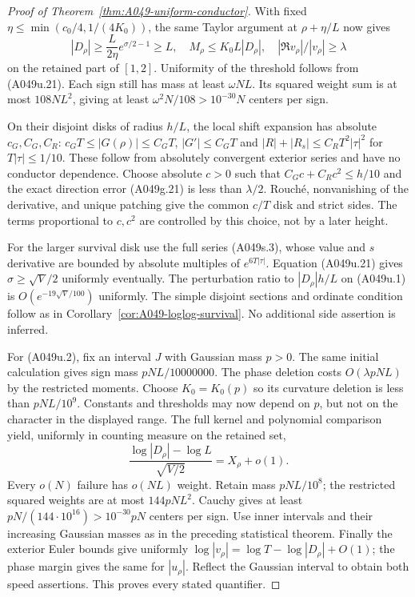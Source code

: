 \begin{proof}[Proof of Theorem~\ref{thm:A049-uniform-conductor}]
With fixed $\eta\le\min(c_0/4,1/(4K_0))$, the same
Taylor argument at $\rho+\eta/L$ now gives
\[
 |D_\rho|\ge\frac{L}{2\eta}e^{\sigma/2-1}\ge L,\quad
 M_\rho\le K_0L|D_\rho|,\quad
 |\Re v_\rho|/|v_\rho|\ge\lambda
\tag{A049u.25}
\]
on the retained part of $[1,2]$. Uniformity of the
threshold follows from (A049u.21).
Each sign still has mass at least $\omega NL$.
Its squared weight sum is at most $108NL^2$, giving
at least $\omega^2N/108>10^{-30}N$ centers per sign.

On their disjoint disks of radius $h/L$, the local
shift expansion has absolute $c_G,C_G,C_R$:
$c_GT\le|G(\rho)|\le C_GT$, $|G'|\le C_GT$ and
$|R|+|R_s|\le C_RT^2|\tau|^2$ for $T|\tau|\le1/10$.
These follow from absolutely convergent exterior
series and have no conductor dependence.
Choose absolute $c>0$ such that
$C_Gc+C_Rc^2\le h/10$ and the exact direction error
(A049g.21) is less than $\lambda/2$.
Rouch\'e, nonvanishing of the derivative, and unique
patching give the common $c/T$ disk and strict sides.
The terms proportional to $c,c^2$ are controlled by
this choice, not by a later height.

For the larger survival disk use the full series
(A049s.3), whose value and $s$ derivative are bounded
by absolute multiples of $e^{6T|\tau|}$.
Equation (A049u.21) gives $\sigma\ge\sqrt V/2$
uniformly eventually. The perturbation ratio to
$|D_\rho|h/L$ on (A049u.1) is
$O(e^{-19\sqrt V/100})$ uniformly.
The simple disjoint sections and ordinate condition
follow as in Corollary~\ref{cor:A049-loglog-survival}.
No additional side assertion is inferred.

For (A049u.2), fix an interval $J$ with Gaussian
mass $p>0$. The same initial calculation gives
sign mass $pNL/10000000$.
The phase deletion costs $O(\lambda pNL)$ by the
restricted moments. Choose $K_0=K_0(p)$ so its
curvature deletion is less than $pNL/10^9$.
Constants and thresholds may now depend on $p$,
but not on the character in the displayed range.
The full kernel and polynomial comparison yield,
uniformly in counting measure on the retained set,
\[
 \frac{\log|D_\rho|-\log L}{\sqrt{V/2}}=X_\rho+o(1).
\]
Every $o(N)$ failure has $o(NL)$ weight.
Retain mass $pNL/10^8$; the restricted squared
weights are at most $144pNL^2$.
Cauchy gives at least
$pN/(144\cdot10^{16})>10^{-30}pN$ centers per sign.
Use inner intervals and their increasing Gaussian
masses as in the preceding statistical theorem.
Finally the exterior Euler bounds give uniformly
$\log|v_\rho|=\log T-\log|D_\rho|+O(1)$; the phase
margin gives the same for $|u_\rho|$.
Reflect the Gaussian interval to obtain both speed
assertions. This proves every stated quantifier.
\end{proof}


